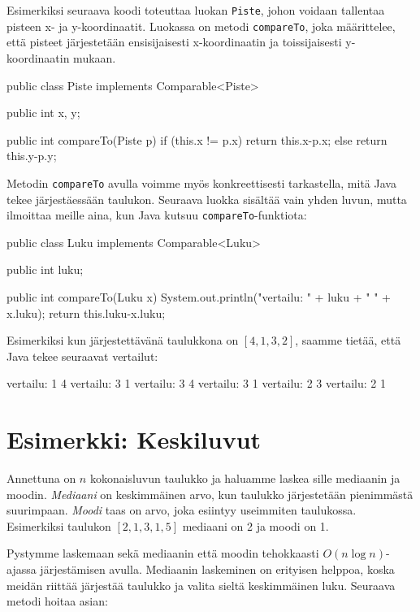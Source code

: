 Esimerkiksi seuraava koodi toteuttaa luokan \texttt{Piste},
johon voidaan tallentaa pisteen x- ja y-koordinaatit.
Luokassa on metodi \texttt{compareTo}, joka määrittelee,
että pisteet järjestetään ensisijaisesti x-koordinaatin ja
toissijaisesti y-koordinaatin mukaan.

\begin{code}
public class Piste implements Comparable<Piste> {
    public int x, y;

    public int compareTo(Piste p) {
        if (this.x != p.x) return this.x-p.x;
        else return this.y-p.y;
    }
}
\end{code}

Metodin \texttt{compareTo} avulla voimme myös konkreettisesti
tarkastella, mitä Java tekee järjestäessään taulukon.
Seuraava luokka sisältää vain yhden luvun,
mutta ilmoittaa meille aina, kun Java kutsuu
\texttt{compareTo}-funktiota:

\begin{code}
public class Luku implements Comparable<Luku> {
    public int luku;

    public int compareTo(Luku x) {
        System.out.println("vertailu: " + luku + " " + x.luku);
        return this.luku-x.luku;
    }
}
\end{code}

Esimerkiksi kun järjestettävänä taulukkona on $[4,1,3,2]$,
saamme tietää, että Java tekee seuraavat vertailut:

\begin{code}
vertailu: 1 4
vertailu: 3 1
vertailu: 3 4
vertailu: 3 1
vertailu: 2 3
vertailu: 2 1
\end{code}

\section{Esimerkki: Keskiluvut}

Annettuna on $n$ kokonaisluvun taulukko ja haluamme
laskea sille mediaanin ja moodin.
\emph{Mediaani} on keskimmäinen arvo, kun taulukko järjestetään
pienimmästä suurimpaan.
\emph{Moodi} taas on arvo, joka esiintyy useimmiten taulukossa.
Esimerkiksi taulukon $[2,1,3,1,5]$ mediaani on 2 ja moodi on 1.

Pystymme laskemaan sekä mediaanin että moodin tehokkaasti
$O(n \log n)$-ajassa järjestämisen avulla.
Mediaanin laskeminen on erityisen helppoa,
koska meidän riittää järjestää taulukko ja valita
sieltä keskimmäinen luku. Seuraava metodi hoitaa asian:

